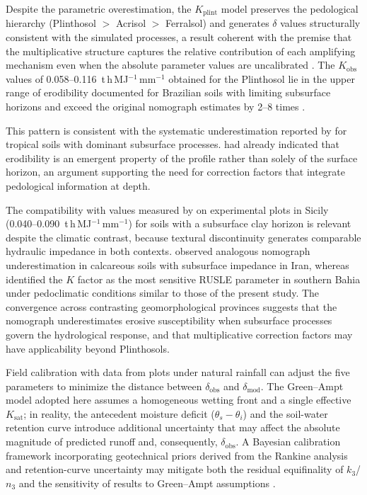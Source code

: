 \documentclass[pdflatex,sn-basic,referee,lineno]{sn-jnl}
\begin{document}
Despite the parametric overestimation, the $K_{\mathrm{plint}}$ model preserves the pedological hierarchy (Plinthosol $>$ Acrisol $>$ Ferralsol) and generates $\delta$ values structurally consistent with the simulated processes, a result coherent with the premise that the multiplicative structure captures the relative contribution of each amplifying mechanism even when the absolute parameter values are uncalibrated \citep{renard_et_al_1997}. The $K_{\mathrm{obs}}$ values of 0.058--0.116~t\,h\,MJ$^{-1}$\,mm$^{-1}$ obtained for the Plinthosol lie in the upper range of erodibility documented for Brazilian soils with limiting subsurface horizons \citep{lafayette_cantalice_coutinho_2011,cassol_et_al_2023} and exceed the original nomograph estimates by 2--8 times \citep{wischmeier_et_al_1971}.

This pattern is consistent with the systematic underestimation reported by \citet{alewell_et_al_2019} for tropical soils with dominant subsurface processes. \citet{torri_poesen_2014} had already indicated that erodibility is an emergent property of the profile rather than solely of the surface horizon, an argument supporting the need for correction factors that integrate pedological information at depth. 

The compatibility with values measured by \citet{bagarello_et_al_2012} on experimental plots in Sicily (0.040--0.090~t\,h\,MJ$^{-1}$\,mm$^{-1}$) for soils with a subsurface clay horizon is relevant despite the climatic contrast, because textural discontinuity generates comparable hydraulic impedance in both contexts. \citet{ostovari_et_al_2016} observed analogous nomograph underestimation in calcareous soils with subsurface impedance in Iran, whereas \citet{francois_et_al_2024} identified the $K$ factor as the most sensitive RUSLE parameter in southern Bahia under pedoclimatic conditions similar to those of the present study. The convergence across contrasting geomorphological provinces suggests that the nomograph underestimates erosive susceptibility when subsurface processes govern the hydrological response, and that multiplicative correction factors may have applicability beyond Plinthosols.

Field calibration with data from plots under natural rainfall can adjust the five parameters to minimize the distance between $\delta_{\mathrm{obs}}$ and $\delta_{\mathrm{mod}}$. The Green--Ampt model adopted here assumes a homogeneous wetting front and a single effective $K_{\mathrm{sat}}$; in reality, the antecedent moisture deficit ($\theta_s - \theta_i$) and the soil-water retention curve introduce additional uncertainty that may affect the absolute magnitude of predicted runoff and, consequently, $\delta_{\mathrm{obs}}$. A Bayesian calibration framework incorporating geotechnical priors derived from the Rankine analysis and retention-curve uncertainty may mitigate both the residual equifinality of $k_3$/$n_3$ and the sensitivity of results to Green--Ampt assumptions \citep{beven_freer_2001}.
\end{document}
